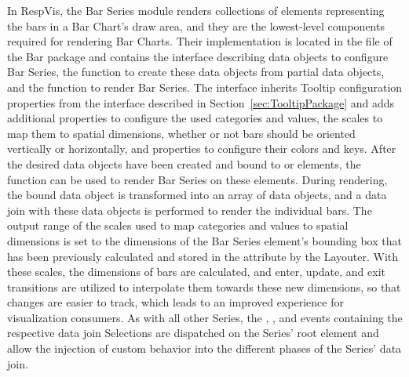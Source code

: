 In RespVis, the Bar Series module renders collections of 
elements representing the bars in a Bar Chart's draw area, and they
are the lowest-level components required for rendering Bar
Charts. Their implementation is located in the 
file of the Bar package and contains the  interface
describing data objects to configure Bar Series, the
 function to create these data objects from
partial data objects, and the  function to
render Bar Series. The  interface inherits Tooltip
configuration properties from the 
interface described in Section~\ref{sec:TooltipPackage} and adds
additional properties to configure the used categories and values, the
scales to map them to spatial dimensions, whether or not bars should
be oriented vertically or horizontally, and properties to configure
their colors and keys. After the desired  data
objects have been created and bound to  or 
elements, the  function can be used to render
Bar Series on these elements. During rendering, the bound
 data object is transformed into an array of
 data objects, and a data join with these data objects is
performed to render the individual bars. The output range of the
scales used to map categories and values to spatial dimensions is set
to the dimensions of the Bar Series element's bounding box that has
been previously calculated and stored in the  attribute
by the Layouter. With these scales, the dimensions of bars are
calculated, and enter, update, and exit transitions are utilized to
interpolate them towards these new dimensions, so that changes are easier to track, which leads to an improved
experience for visualization consumers. As with all other Series, the
, , and  events containing the
respective data join Selections are dispatched on the Series' root
element and allow the injection of custom behavior into the different
phases of the Series' data join.

